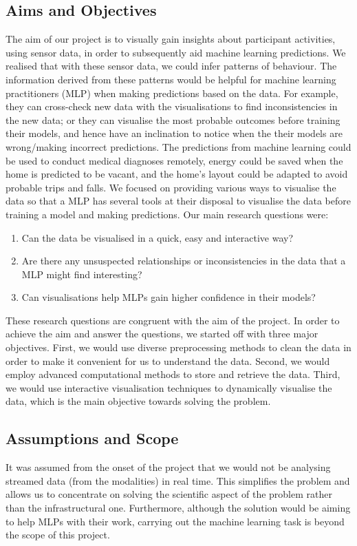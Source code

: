 \documentclass[fleqn,10pt]{SelfArx} %
\begin{document}
	\subsection{Aims and Objectives}
The aim of our project is to visually gain insights about participant activities, using sensor data, in order to subsequently aid machine learning predictions. We realised that with these sensor data, we could infer patterns of behaviour. The information derived from these patterns would be helpful for machine learning practitioners (MLP) when making predictions based on the data. For example, they can cross-check new data with the visualisations to find inconsistencies in the new data; or they can visualise the most probable outcomes before training their models, and hence have an inclination to notice when the their models are wrong/making incorrect predictions. The predictions from machine learning could be used to conduct medical diagnoses remotely, energy could be saved when the home is predicted to be vacant, and the home’s layout could be adapted to avoid probable trips and falls. We focused on providing various ways to visualise the data so that a MLP has several tools at their disposal to visualise the data before training a model and making predictions. Our main research questions were:
\begin{enumerate}
\item Can the data be visualised in a quick, easy and interactive way?
\item Are there any unsuspected relationships or inconsistencies in the data that a MLP might find interesting?
\item Can visualisations help MLPs gain higher confidence in their models?
\end{enumerate}
These research questions are congruent with the aim of the project. In order to achieve the aim and answer the questions, we started off with three major objectives. First, we would use diverse preprocessing methods to clean the data in order to make it convenient for us to understand the data. Second, we would employ advanced computational methods to store and retrieve the data. Third, we would use interactive visualisation techniques to dynamically visualise the data, which is the main objective towards solving the problem. \\

	\subsection{Assumptions and Scope}
It was assumed from the onset of the project that we would not be analysing streamed data (from the modalities) in real time. This simplifies the problem and allows us to concentrate on solving the scientific aspect of the problem rather than the infrastructural one. Furthermore, although the solution would be aiming to help MLPs with their work, carrying out the machine learning task is beyond the scope of this project. \\
\end{document}
